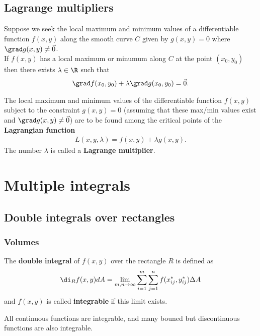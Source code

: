 \documentclass{article}
\begin{document}
\subsection{Lagrange multipliers}


\begin{theorem}
    Suppose we seek the local maximum and minimum values of a differentiable
    function $f(x,y)$ along the smooth curve $C$ given by $g(x,y)=0$ where
    $\grad g(x,y)\not=\vec 0$.\\
    If $f(x,y)$ has a local maximum or minumum along $C$ at the point
    $(x_0, y_0)$ then there exists $\lambda\in\R$ such that
    \begin{align*}
        \grad f(x_0, y_0) + \lambda\grad g(x_0, y_0) = \vec 0.
    \end{align*}
\end{theorem}
\begin{theorem}
    The local maximum and minimum values of the differentiable function
    $f(x,y)$ subject to the constraint $g(x,y)=0$ (assuming that these
    max/min values exist and $\grad g(x,y)\not=\vec 0$) are to be found
    among the critical points of the \textbf{Lagrangian function}
    \begin{align*}
        L(x,y,\lambda)=f(x,y)+\lambda g(x,y).
    \end{align*}
    The number $\lambda$ is called a \textbf{Lagrange multiplier}.
\end{theorem}



\section{Multiple integrals}



\subsection{Double integrals over rectangles}


\subsubsection{Volumes}

\begin{definition}
    The \textbf{double integral} of $f(x,y)$ over the rectangle $R$ is defined as
    \begin{align*}
        \di_R f(x,y)dA = \lim_{m,n\to\infty}\sum_{i=1}^m\sum_{j=1}^n f(x_{ij}^*, y_{ij}^*)\Delta A
    \end{align*}
    and $f(x,y)$ is called \textbf{integrable} if this limit exists.
\end{definition}
\begin{lemma}
    All continuous functions are integrable, and many bouned but
    discontinuous functions are also integrable.
\end{lemma}
\end{document}
